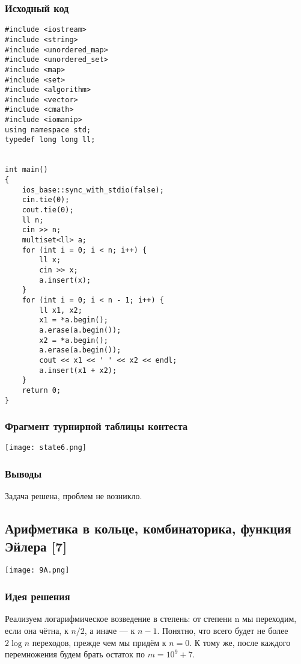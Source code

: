 \documentclass[12pt]{article}
\begin{document}
\subsubsection*{Исходный код}
\begin{lstlisting}
#include <iostream>
#include <string>
#include <unordered_map>
#include <unordered_set>
#include <map>
#include <set>
#include <algorithm>
#include <vector>
#include <cmath>
#include <iomanip>
using namespace std;
typedef long long ll;


int main()
{
    ios_base::sync_with_stdio(false);
    cin.tie(0);
    cout.tie(0);
    ll n;
    cin >> n;
    multiset<ll> a;
    for (int i = 0; i < n; i++) {
        ll x;
        cin >> x;
        a.insert(x);
    }
    for (int i = 0; i < n - 1; i++) {
        ll x1, x2;
        x1 = *a.begin();
        a.erase(a.begin());
        x2 = *a.begin();
        a.erase(a.begin());
        cout << x1 << ' ' << x2 << endl;
        a.insert(x1 + x2);
    }
    return 0;
}
\end{lstlisting}
\subsubsection*{Фрагмент турнирной таблицы контеста}
\begin{center}
\texttt{[image: state6.png]}\newline\noindent
\end{center}

\subsubsection*{Выводы}
Задача решена, проблем не возникло.
\subsection*{Арифметика в кольце, комбинаторика, функция Эйлера [7] }
\begin{center}
\texttt{[image: 9A.png]}
\end{center}
\subsubsection*{Идея решения}
Реализуем логарифмическое возведение в степень: от степени n мы переходим, если она чётна, к $n / 2$, а иначе — к $n-1$. Понятно, что всего будет не более $2 \log n$ переходов, прежде чем мы придём к $n = 0$. К тому же, после каждого перемножения будем брать остаток по $m=10^9+7$.
\end{document}
